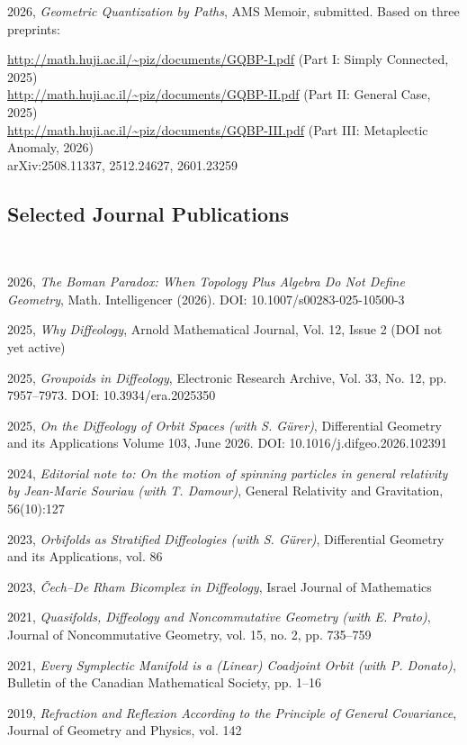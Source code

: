 \documentclass[11pt,reqno]{amsart}
\newcommand{\pubitem}[3]{\noindent\hangindent=0.5cm #1, \emph{#2}, #3\vspace{.3ex}\par}
\begin{document}
  \pubitem{2026}{Geometric Quantization by Paths}{AMS Memoir, submitted. Based on three preprints:}
  \url{http://math.huji.ac.il/~piz/documents/GQBP-I.pdf} (Part I: Simply Connected, 2025) \\
  \url{http://math.huji.ac.il/~piz/documents/GQBP-II.pdf} (Part II: General Case, 2025) \\
  \url{http://math.huji.ac.il/~piz/documents/GQBP-III.pdf} (Part III: Metaplectic Anomaly, 2026) \\
  arXiv:2508.11337, 2512.24627, 2601.23259
  
  \subsection*{Selected Journal Publications} \null\
  
  \pubitem{2026}{The Boman Paradox: When Topology Plus Algebra Do Not Define Geometry}{Math. Intelligencer (2026). DOI: 10.1007/s00283-025-10500-3}
  
  \pubitem{2025}{Why Diffeology}{Arnold Mathematical Journal, Vol. 12, Issue 2 (DOI not yet active)}
  
  \pubitem{2025}{Groupoids in Diffeology}{Electronic Research Archive, Vol. 33, No. 12, pp. 7957–7973. DOI: 10.3934/era.2025350}
  
  \pubitem{2025}{On the Diffeology of Orbit Spaces (with S. Gürer)}{Differential Geometry and its Applications Volume 103, June 2026. DOI: 10.1016/j.difgeo.2026.102391}
  
  \pubitem{2024}{Editorial note to: On the motion of spinning particles in general relativity by Jean-Marie Souriau (with T. Damour)}{General Relativity and Gravitation, 56(10):127}
  
  \pubitem{2023}{Orbifolds as Stratified Diffeologies (with S. Gürer)}{Differential Geometry and its Applications, vol. 86}
  
  \pubitem{2023}{Čech–De Rham Bicomplex in Diffeology}{Israel Journal of Mathematics}
  
  \pubitem{2021}{Quasifolds, Diffeology and Noncommutative Geometry (with E. Prato)}{Journal of Noncommutative Geometry, vol. 15, no. 2, pp. 735–759}
  
  \pubitem{2021}{Every Symplectic Manifold is a (Linear) Coadjoint Orbit (with P. Donato)}{Bulletin of the Canadian Mathematical Society, pp. 1–16}
  
  \pubitem{2019}{Refraction and Reflexion According to the Principle of General Covariance}{Journal of Geometry and Physics, vol. 142}
  
\end{document}
